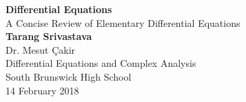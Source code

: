 \documentclass[11pt]{report}
\author{Tarang}
\theoremstyle{definition}
\theoremstyle{definition}
\begin{document}
	
	\begin{titlepage}
		\begin{center}
			\vspace*{1cm}
			\Huge
			\textbf{Differential Equations}\\
			\vspace{0.5cm}
			\LARGE
			A Concise Review of Elementary Differential Equations\\
			\vspace{1.5cm}
			\textbf{Tarang Srivastava}\\
			\vfill
			\vspace{0.8cm}
			\Large
			Dr. Mesut \c{C}akir\\
			Differential Equations and Complex Analysis\\
			South Brunswick High School\\
			14 February 2018
		\end{center}
	\end{titlepage}
	
	\tableofcontents	
	\pagebreak
	
	
	
	
	
	
	
	
	
	
\end{document}
